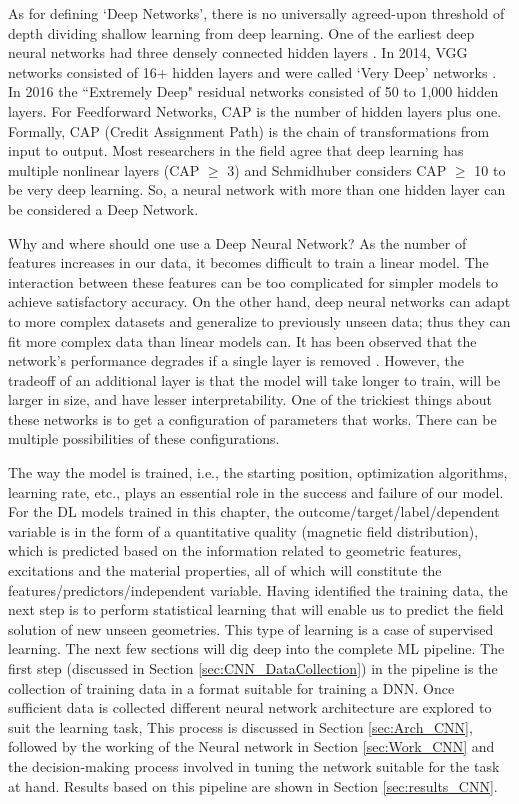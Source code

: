 As for defining `Deep Networks', there is no universally agreed-upon threshold of depth dividing shallow learning from deep learning. One of the earliest deep neural networks had three densely connected hidden layers \parencite{hinton2006fast}. In 2014, VGG networks consisted of 16+ hidden layers and were called `Very Deep' networks \parencite{simonyan2014very}. In 2016 the ``Extremely Deep" residual networks \parencite{he2016deep} consisted of 50 to 1,000 hidden layers. For Feedforward Networks, CAP is the number of hidden layers plus one. Formally, CAP (Credit Assignment Path) is the chain of transformations from input to output. Most researchers in the field agree that deep learning has multiple nonlinear layers (CAP $\geq$ 3) and Schmidhuber \parencite{schmidhuber2015deep} considers CAP $\geq$ 10 to be very deep learning. So, a neural network with more than one hidden layer can be considered a Deep Network.

Why and where should one use a Deep Neural Network? As the number of features increases in our data, it becomes difficult to train a linear model. The interaction between these features can be too complicated for simpler models to achieve satisfactory accuracy. On the other hand, deep neural networks can adapt to more complex datasets and generalize to previously unseen data; thus they can fit more complex data than linear models can. It has been observed that the network’s performance degrades if a single layer is removed \parencite{krizhevsky2012imagenet}. However, the tradeoff of an additional layer is that the model will take longer to train, will be larger in size, and have lesser interpretability. One of the trickiest things about these networks is to get a configuration of parameters that works. There can be multiple possibilities of these configurations. 

The way the model is trained, i.e., the starting position, optimization algorithms, learning rate, etc., plays an essential role in the success and failure of our model. For the DL models trained in this chapter, the outcome/target/label/dependent variable is in the form of a quantitative quality (magnetic field distribution), which is predicted based on the information related to geometric features, excitations and the material properties, all of which will constitute the features/predictors/independent variable. Having identified the training data, the next step is to perform statistical learning that will enable us to predict the field solution of new unseen geometries. This type of learning is a case of supervised learning. The next few sections will dig deep into the complete ML pipeline. The first step (discussed in Section \ref{sec:CNN_DataCollection}) in the pipeline is the collection of training data in a format suitable for training a DNN. Once sufficient data is collected different neural network architecture are explored to suit the learning task, This process is discussed in Section \ref{sec:Arch_CNN}, followed by the working of the Neural network in Section \ref{sec:Work_CNN} and the decision-making process involved in tuning the network suitable for the task at hand. Results based on this pipeline are shown in Section \ref{sec:results_CNN}. 

